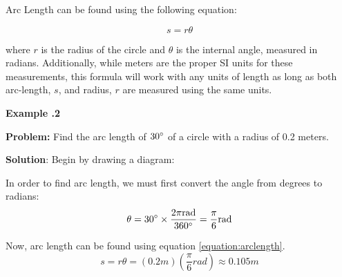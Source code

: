   
   	

   
   
   
   
   
   
   
   
   
    Arc Length can be found using the following equation:
   
   	\begin{mdframed}[backgroundcolor=orange!20!white]
   	
   	\begin{equation}
   		s = r \theta
   		\label{equation:arclength}
   	\end{equation}
   \end{mdframed}
where $r$ is the radius of the circle and $\theta$ is the internal angle, measured in radians. Additionally, while meters are the proper SI units for these measurements, this formula will work with any units of length as long as both arc-length, $s$, and radius, $r$ are measured using the same units.  




\newpage

  \begin{mdframed}[backgroundcolor=blue!10!white]
	\begin{center}	
		\textbf{Example \thesection.2}	
	\end{center}
	
	\textbf{Problem:} Find the arc length of $30\degree$ of a circle with a radius of 0.2 meters.  
	 
	
	\vspace{0.2 in} 
	\textbf{Solution}: Begin by drawing a diagram:
	
	
	 	  \begin{center}
	\end{center}

	In order to find arc length, we must first convert the angle from degrees to radians:
	\begin{equation*}
	\theta = 30 \degree \times \frac{2 \pi \si{rad}} {360 \degree} = \frac{\pi}{6} \si{rad}
	\end{equation*}
	
	Now, arc length can be found using equation \ref{equation:arclength}.
	\begin{equation*}
		s = r \theta = (0.2 \si{m})(\frac{\pi}{6} \si{rad}) \approx 0.105 \si{m}
	\end{equation*}
	
	
\end{mdframed}
  
